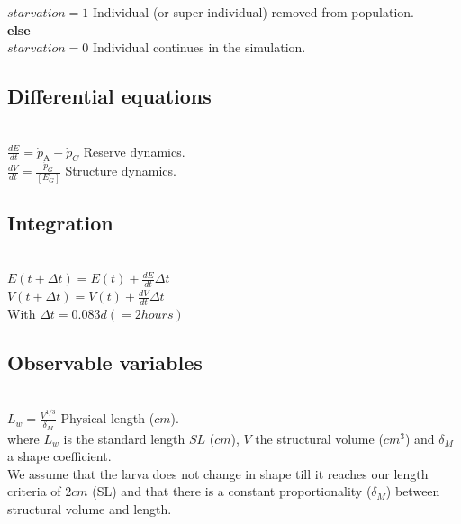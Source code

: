 $starvation = 1$ \hfill Individual (or super-individual) removed from population.\\

\textbf{else}\\

$starvation = 0$ \hfill Individual continues in the simulation.\\

\subsection*{Differential equations}
\hfill \\

$\frac{dE}{dt} = \dot{p}_\mathrm{A} - \dot{p}_{C}$ \hfill Reserve dynamics.\\

$\frac{dV}{dt} = \frac{\dot{p}_{G}}{\left[ E_{G} \right]}$ \hfill Structure dynamics.\\

\subsection*{Integration}
\hfill \\

$E\left ( t + \Delta t \right ) = E\left ( t \right ) + \frac{dE}{dt}\Delta t$ \\

$V\left ( t + \Delta t \right ) = V\left ( t \right ) + \frac{dV}{dt}\Delta t$ \\

With $\Delta t = 0.083 d \left (=2hours\right )$

\subsection*{Observable variables}
\hfill \\

$L_{w} = \frac{V^{1/3}}{\delta_{M}}$ \hfill Physical length ($cm$).\\

where $L_{w}$ is the standard length $SL$ ($cm$), $V$ the structural volume ($cm^3$) and $\delta_{M}$ a shape coefficient.\\

We assume that the larva does not change in shape till it reaches our length criteria of $2cm$ (SL) and that there is a constant proportionality ($\delta_{M}$) between structural volume and length.\\


